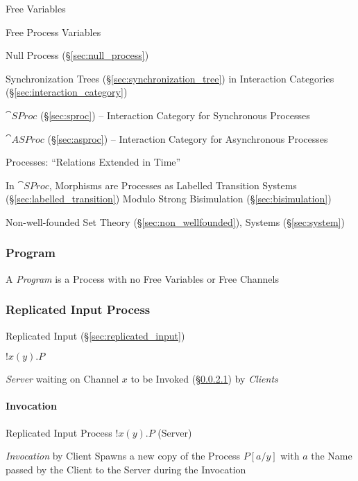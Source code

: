 Free Variables

Free Process Variables

Null Process (\S\ref{sec:null_process})


\asterism


Synchronization Trees (\S\ref{sec:synchronization_tree}) in
Interaction Categories (\S\ref{sec:interaction_category})

$\cat{SProc}$ (\S\ref{sec:sproc}) -- Interaction Category for
Synchronous Processes

$\cat{ASProc}$ (\S\ref{sec:asproc}) -- Interaction Category for
Asynchronous Processes

Processes: ``Relations Extended in Time''

In $\cat{SProc}$, Morphisms are Processes as Labelled Transition
Systems (\S\ref{sec:labelled_transition}) Modulo Strong Bisimulation
(\S\ref{sec:bisimulation})

Non-well-founded Set Theory (\S\ref{sec:non_wellfounded}), Systems
(\S\ref{sec:system})



\subsubsection{Program}\label{sec:program}

A \emph{Program} is a Process with no Free Variables or Free Channels



\subsubsection{Replicated Input Process}
\label{sec:replicated_input_process}

Replicated Input (\S\ref{sec:replicated_input})

$!x(y).P$

\emph{Server} waiting on Channel $x$ to be Invoked
(\S\ref{sec:invocation}) by \emph{Clients}



\paragraph{Invocation}\label{sec:invocation}\hfill

Replicated Input Process $!x(y).P$ (Server)

\emph{Invocation} by Client Spawns a new copy of the Process $P[a/y]$
with $a$ the Name passed by the Client to the Server during the
Invocation




